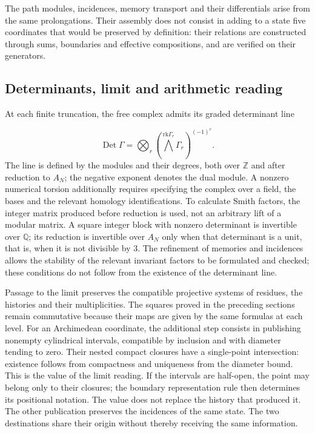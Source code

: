 The path modules, incidences, memory transport and their differentials arise from the same prolongations. Their assembly does not consist in adding to a state five coordinates that would be preserved by definition: their relations are constructed through sums, boundaries and effective compositions, and are verified on their generators.

\subsection{Determinants, limit and arithmetic reading}
At each finite truncation, the free complex admits its graded determinant line

\[
\operatorname{Det}\Gamma=
\bigotimes_r\left(\bigwedge^{\mathrm{rk}\Gamma_r}\Gamma_r\right)^{(-1)^r}.
\]
The line is defined by the modules and their degrees, both over \(\mathbb Z\) and after reduction to \(A_N\); the negative exponent denotes the dual module. A nonzero numerical torsion additionally requires specifying the complex over a field, the bases and the relevant homology identifications. To calculate Smith factors, the integer matrix produced before reduction is used, not an arbitrary lift of a modular matrix. A square integer block with nonzero determinant is invertible over \(\mathbb Q\); its reduction is invertible over \(A_N\) only when that determinant is a unit, that is, when it is not divisible by \(3\). The refinement of memories and incidences allows the stability of the relevant invariant factors to be formulated and checked; these conditions do not follow from the existence of the determinant line.

Passage to the limit preserves the compatible projective systems of residues, the histories and their multiplicities. The squares proved in the preceding sections remain commutative because their maps are given by the same formulas at each level. For an Archimedean coordinate, the additional step consists in publishing nonempty cylindrical intervals, compatible by inclusion and with diameter tending to zero. Their nested compact closures have a single-point intersection: existence follows from compactness and uniqueness from the diameter bound. This is the value of the limit reading. If the intervals are half-open, the point may belong only to their closures; the boundary representation rule then determines its positional notation. The value does not replace the history that produced it. The other publication preserves the incidences of the same state. The two destinations share their origin without thereby receiving the same information.

